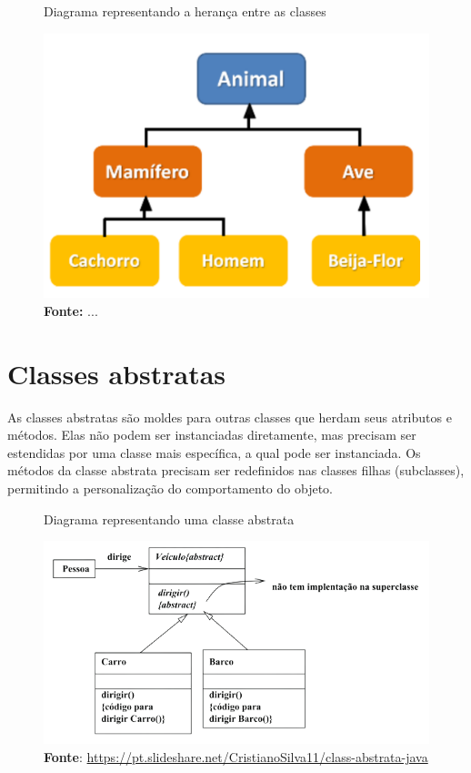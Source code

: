 \begin{figure}[H]
  \centering
  \caption{Diagrama representando a herança entre as classes}
  \includegraphics[scale=0.3]{imagens/heranca.png}
  \caption*{\textbf{Fonte:} ...}
  \label{fig:heranca}
\end{figure}

\section{Classes abstratas}

As classes abstratas são moldes para outras classes que herdam seus atributos e métodos. Elas não podem ser instanciadas diretamente, mas precisam ser estendidas por uma classe mais específica, a qual pode ser instanciada. Os métodos da classe abstrata precisam ser redefinidos nas classes filhas (subclasses), permitindo a personalização do comportamento do objeto. 

\begin{figure}[H]
	\centering
	\caption{Diagrama representando uma classe abstrata}
	\includegraphics[scale=0.6]{imagens/classe-abstrata.png}
	\caption*{\textbf{Fonte}: \url{https://pt.slideshare.net/CristianoSilva11/class-abstrata-java}}
	\label{fig:abstrata}
\end{figure}

